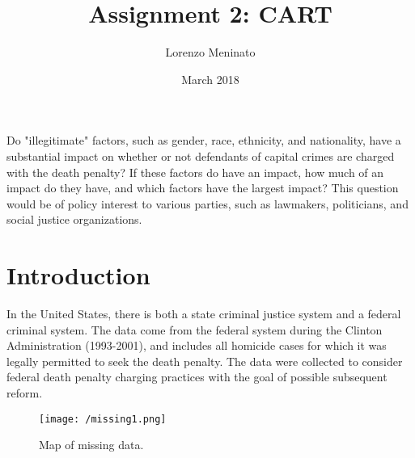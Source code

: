 \documentclass{article}
\title{Assignment 2: CART}
\author{Lorenzo Meninato}
\date{March 2018}
\begin{document}
\maketitle

Do "illegitimate" factors, such as gender, race, ethnicity, and nationality, have a substantial impact on whether or not defendants of capital crimes are charged with the death penalty? If these factors do have an impact, how much of an impact do they have, and which factors have the largest impact? This question would be of policy interest to various parties, such as lawmakers, politicians, and social justice organizations. 

\section{Introduction}
In the United States, there is both a state criminal justice system and a federal criminal system. The data come from the federal system during the Clinton Administration (1993-2001), and includes all homicide cases for which it was legally permitted to seek the death penalty. The data were collected to consider federal death penalty charging practices with the goal of possible subsequent reform. 

\begin{figure}[!htb]
    \centering
    \texttt{[image: /missing1.png]}
    \caption{Map of missing data.}
    \label{mis1}
\end{figure}
\end{document}
